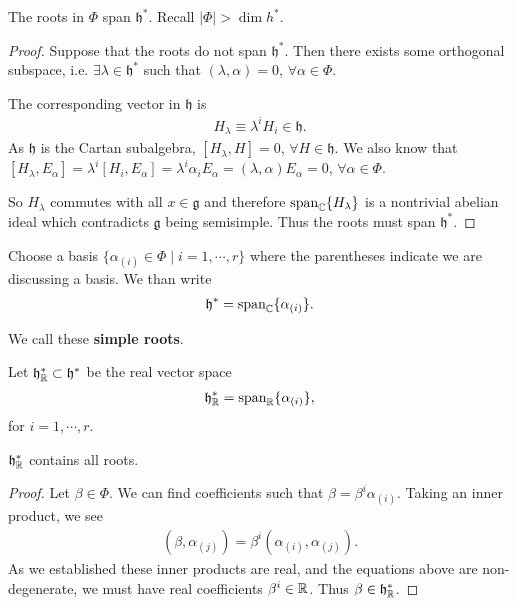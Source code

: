 
\begin{claim}
    The roots in $\Phi$ span $\mathfrak{h}^{*}$. Recall $\left| \Phi \right| > \dim h^{*}$.
\end{claim}
\begin{proof}
    Suppose that the roots do not span $\mathfrak{h}^{*}$. Then there exists some orthogonal subspace, i.e. $\exists \lambda \in \mathfrak{h}^{*}$ such that $\left( \lambda, \alpha \right) =  0$, $\forall \alpha \in \Phi$.

    The corresponding vector in $\mathfrak{h}$ is
    \begin{align}
        H_\lambda \equiv \lambda^{i} H_i \in \mathfrak{h}
    .\end{align}
    As $\mathfrak{h}$ is the Cartan subalgebra, $\left[ H_{\lambda}, H \right] = 0$, $\forall H \in \mathfrak{h}$. We also know that $\left[ H_\lambda, E_\alpha \right] = \lambda^{i} \left[ H_i , E_\alpha \right] = \lambda^{i} \alpha_i E_\alpha = \left( \lambda, \alpha \right) E_\alpha = 0$, $\forall \alpha \in \Phi$.

    So $H_\lambda$ commutes with all $x \in \mathfrak{g}$ and therefore $\text{span}_{\mathbb{C}} \{H_\lambda\} $ is a nontrivial abelian ideal which contradicts $\mathfrak{g}$ being semisimple. Thus the roots must span $\mathfrak{h}^{*}$.
\end{proof}

Choose a basis $\{ \alpha_{\left( i \right) } \in \Phi  \mid i = 1, \cdots, r\} $ where the parentheses indicate we are discussing a basis. We than write
\begin{align}
    \mathfrak{h}^{*} = \text{span}_{\mathbb{C}} \{\alpha_{\left( i \right) }\}
.\end{align}

We call these \textbf{simple roots}.

Let $\mathfrak{h}^{*}_{\mathbb{R}} \subset \mathfrak{h}^{*}$ be the real vector space
\begin{align}
    \mathfrak{h}^{*}_{\mathbb{R}} = \text{span}_{\mathbb{R}} \{\alpha_{\left( i \right) }\} 
,\end{align}
for $i = 1, \cdots, r$.

\begin{claim}
    $\mathfrak{h}^{*}_{\mathbb{R}}$ contains all roots.
\end{claim}

\begin{proof}
    Let $\beta \in \Phi$. We can find coefficients such that $\beta = \beta^{i}\alpha_{\left( i \right) }$.
    Taking an inner product, we see
    \begin{align}
        \left( \beta, \alpha_{\left( j \right) } \right) = \beta^{i} \left( \alpha_{\left( i \right) }, \alpha_{\left( j \right) } \right) 
    .\end{align}
    As we established these inner products are real, and the equations above are non-degenerate, we must have real coefficients $\beta^{i} \in \mathbb{R}$. Thus $\beta \in \mathfrak{h}_{\mathbb{R}}^{*}$.
\end{proof}

